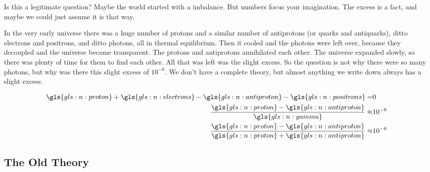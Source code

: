 \documentclass[]{article}
\begin{document}
Is this a legitimate question? Maybe the world started with a imbalance. But numbers focus your imagination. The excess is  a fact, and maybe we could just assume it is that way.

In the very early universe there was a huge number of protons and a similar number of antiprotons (or quarks and antiquarks), ditto electrons and positrons, and ditto photons, all in thermal equilibrium. Then it cooled and the photons were left over, because they decoupled and the universe became transparent. The protons and antiprotons annihilated each other. The universe expanded slowly, so there was plenty of time for them to find each other. All that was left was the slight excess. So the question is not why there were so many photons, but why was there this slight excess of $10^{-8}$. We don't have a complete theory, but almost anything we write down always has a slight excess.

\begin{align*}
	\gls{gls:n:proton}+\gls{gls:n:electrons}-\gls{gls:n:antiproton}-\gls{gls:n:positrons} =& 0\\
	\frac{\gls{gls:n:proton}-\gls{gls:n:antiproton}}{\gls{gls:n:gamma}}\approx&10^{-8}\\
	\frac{\gls{gls:n:proton}-\gls{gls:n:antiproton}}{\gls{gls:n:proton}+\gls{gls:n:antiproton}}\approx&10^{-8}
\end{align*}

\subsection{The Old Theory}
\end{document}
